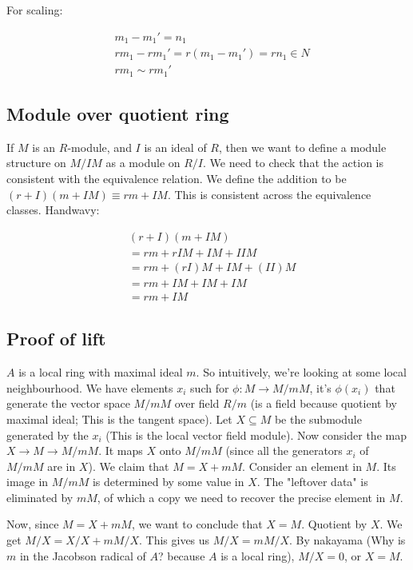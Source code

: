 \documentclass{book}
\begin{document}
For scaling:

\begin{align*}
&m_1 - m_1' = n_1 \\
&rm_1 - rm_1' = r(m_1 - m_1') = rn_1 \in N \\
&rm_1 \sim rm_1'
\end{align*}

\subsection{Module over quotient ring}

If $M$ is an $R$-module, and $I$ is an ideal of $R$, then we want to define a module structure on $M/IM$ as a module
on $R/I$. We need to check that the action is consistent with the equivalence relation. We define
the addition to be $(r + I)(m + IM) \equiv rm + IM$. This is consistent across the equivalence classes. Handwavy:

$$
\begin{align*}
&(r + I)(m + IM) \\
&= rm + rIM + IM + IIM \\
&= rm + (rI)M + IM + (II)M \\
&= rm + IM + IM + IM \\
&= rm + IM
\end{align*}
$$


\subsection{Proof of lift}

$A$ is a local ring with maximal ideal $m$. So intuitively, we're looking at some local neighbourhood.
We have elements $x_i$ such for $\phi: M \rightarrow M/mM$, it's $\phi(x_i)$ that generate the vector space
$M/mM$ over field $R/m$ (is a field because quotient by maximal ideal; This is the tangent space).
Let $X \subseteq M$ be the submodule generated by the $x_i$ (This is the local vector field module).
Now consider the map $X \rightarrow M \rightarrow M/mM$. It maps $X$
onto $M/mM$ (since all the generators $x_i$ of $M/mM$ are in $X$). We claim that $M = X + mM$.
Consider an element in $M$. Its image in $M/mM$ is determined by some value in $X$. The "leftover data"
is eliminated by $mM$, of which a copy we need to recover the precise element in $M$. 

Now, since $M = X + mM$, we want to conclude that $X = M$. Quotient by $X$. We get $M/X = X/X + mM/X$.
This gives us $M/X = mM/X$. By nakayama (Why is $m$ in the Jacobson radical of $A$? because $A$ is a local ring), $M/X = 0$, or $X = M$.
\end{document}
